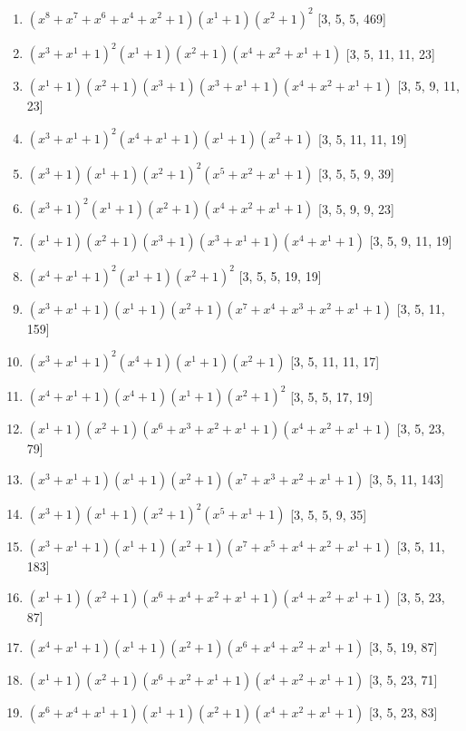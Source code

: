 \documentclass[10pt,twocolumn]{article}
\begin{document}
\begin{enumerate}
\item $(x^{8} + x^{7} + x^{6} + x^{4} + x^{2} + 1)(x^{1} + 1)(x^{2} + 1)^{2}$  [3, 5, 5, 469]
\item $(x^{3} + x^{1} + 1)^{2}(x^{1} + 1)(x^{2} + 1)(x^{4} + x^{2} + x^{1} + 1)$  [3, 5, 11, 11, 23]
\item $(x^{1} + 1)(x^{2} + 1)(x^{3} + 1)(x^{3} + x^{1} + 1)(x^{4} + x^{2} + x^{1} + 1)$  [3, 5, 9, 11, 23]
\item $(x^{3} + x^{1} + 1)^{2}(x^{4} + x^{1} + 1)(x^{1} + 1)(x^{2} + 1)$  [3, 5, 11, 11, 19]
\item $(x^{3} + 1)(x^{1} + 1)(x^{2} + 1)^{2}(x^{5} + x^{2} + x^{1} + 1)$  [3, 5, 5, 9, 39]
\item $(x^{3} + 1)^{2}(x^{1} + 1)(x^{2} + 1)(x^{4} + x^{2} + x^{1} + 1)$  [3, 5, 9, 9, 23]
\item $(x^{1} + 1)(x^{2} + 1)(x^{3} + 1)(x^{3} + x^{1} + 1)(x^{4} + x^{1} + 1)$  [3, 5, 9, 11, 19]
\item $(x^{4} + x^{1} + 1)^{2}(x^{1} + 1)(x^{2} + 1)^{2}$  [3, 5, 5, 19, 19]
\item $(x^{3} + x^{1} + 1)(x^{1} + 1)(x^{2} + 1)(x^{7} + x^{4} + x^{3} + x^{2} + x^{1} + 1)$  [3, 5, 11, 159]
\item $(x^{3} + x^{1} + 1)^{2}(x^{4} + 1)(x^{1} + 1)(x^{2} + 1)$  [3, 5, 11, 11, 17]
\item $(x^{4} + x^{1} + 1)(x^{4} + 1)(x^{1} + 1)(x^{2} + 1)^{2}$  [3, 5, 5, 17, 19]
\item $(x^{1} + 1)(x^{2} + 1)(x^{6} + x^{3} + x^{2} + x^{1} + 1)(x^{4} + x^{2} + x^{1} + 1)$  [3, 5, 23, 79]
\item $(x^{3} + x^{1} + 1)(x^{1} + 1)(x^{2} + 1)(x^{7} + x^{3} + x^{2} + x^{1} + 1)$  [3, 5, 11, 143]
\item $(x^{3} + 1)(x^{1} + 1)(x^{2} + 1)^{2}(x^{5} + x^{1} + 1)$  [3, 5, 5, 9, 35]
\item $(x^{3} + x^{1} + 1)(x^{1} + 1)(x^{2} + 1)(x^{7} + x^{5} + x^{4} + x^{2} + x^{1} + 1)$  [3, 5, 11, 183]
\item $(x^{1} + 1)(x^{2} + 1)(x^{6} + x^{4} + x^{2} + x^{1} + 1)(x^{4} + x^{2} + x^{1} + 1)$  [3, 5, 23, 87]
\item $(x^{4} + x^{1} + 1)(x^{1} + 1)(x^{2} + 1)(x^{6} + x^{4} + x^{2} + x^{1} + 1)$  [3, 5, 19, 87]
\item $(x^{1} + 1)(x^{2} + 1)(x^{6} + x^{2} + x^{1} + 1)(x^{4} + x^{2} + x^{1} + 1)$  [3, 5, 23, 71]
\item $(x^{6} + x^{4} + x^{1} + 1)(x^{1} + 1)(x^{2} + 1)(x^{4} + x^{2} + x^{1} + 1)$  [3, 5, 23, 83]

\end{enumerate}
\end{document}
